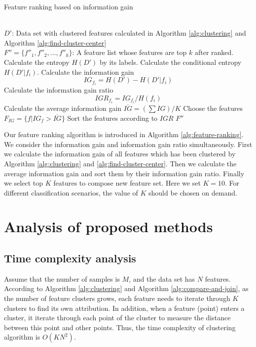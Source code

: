 \documentclass{ieeeaccess}
\theoremstyle{definition}
\begin{document}
\begin{algorithm}
    \caption{Feature ranking based on information gain}
    \label{alg:feature-ranking}
    \begin{algorithmic}[1]
        \REQUIRE ~~\\
            $D'$: Data set with clustered features calculated in Algorithm \ref{alg:clustering} and Algorithm \ref{alg:find-cluster-center}
        \ENSURE ~~\\
            $F''=\{f''_1, f''_2, \ldots, f''_k\}$: A feature list whose features are top $k$ after ranked.
        \STATE Calculate the entropy $H(D')$ by its labels.
            \STATE Calculate the conditional entropy $H(D'|f_i)$.
            \STATE Calculate the information gain $$IG_{f_i} = H(D') - H(D'|f_i)$$
            \STATE Calculate the information gain ratio
            $$IGR_{f_i} = IG_{f_i}/H(f_i)$$
        \ENDFOR
        \STATE Calculate the average information gain \newline $\overline{IG}=(\sum IG)/K$
        \STATE Choose the features $F_{IG}=\{f|IG_{f} > \overline{IG}\}$
        \STATE Sort the features according to $IGR$
        \RETURN $F''$
        \end{algorithmic}
\end{algorithm}

Our feature ranking algorithm is introduced in Algorithm \ref{alg:feature-ranking}. We consider the information gain and information gain ratio simultaneously. First we calculate the information gain of all features which has been clustered by Algorithm \ref{alg:clustering} and \ref{alg:find-cluster-center}. Then we calculate the average information gain and sort them by their information gain ratio. Finally we select top $K$ features to compose new feature set. Here we set $K=10$. For different classification scenarios, the value of $K$ should be chosen on demand.

\section{Analysis of proposed methods}
\label{sec:analysis}

\subsection{Time complexity analysis}

Assume that the number of samples is $M$, and the data set has $N$ features. According to Algorithm \ref{alg:clustering} and Algorithm \ref{alg:compare-and-join}, as the number of feature clusters grows, each feature needs to iterate through $K$ clusters to find its own attribution. In addition, when a feature (point) enters a cluster, it iterate through each point of the cluster to measure the distance between this point and other points. Thus, the time complexity of clustering algorithm is $O(KN^2)$. 
\end{document}
